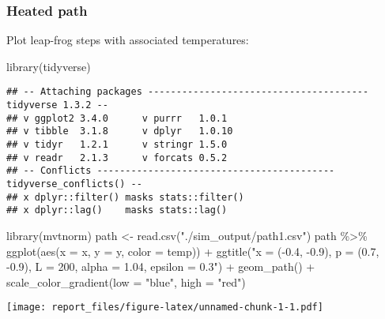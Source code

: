 \documentclass[
]{article}
\author{}
\date{\vspace{-2.5em}}
\newenvironment{Shaded}{\begin{snugshade}}{\end{snugshade}}
\newcommand{\AttributeTok}[1]{\textcolor[rgb]{0.77,0.63,0.00}{#1}}
\newcommand{\FunctionTok}[1]{\textcolor[rgb]{0.00,0.00,0.00}{#1}}
\newcommand{\NormalTok}[1]{#1}
\newcommand{\OtherTok}[1]{\textcolor[rgb]{0.56,0.35,0.01}{#1}}
\newcommand{\SpecialCharTok}[1]{\textcolor[rgb]{0.00,0.00,0.00}{#1}}
\newcommand{\StringTok}[1]{\textcolor[rgb]{0.31,0.60,0.02}{#1}}
\begin{document}
\hypertarget{heated-path}{%
\subsubsection{Heated path}\label{heated-path}}

Plot leap-frog steps with associated temperatures:

\begin{Shaded}
\begin{Highlighting}[]
\FunctionTok{library}\NormalTok{(tidyverse)}
\end{Highlighting}
\end{Shaded}

\begin{verbatim}
## -- Attaching packages --------------------------------------- tidyverse 1.3.2 --
## v ggplot2 3.4.0      v purrr   1.0.1 
## v tibble  3.1.8      v dplyr   1.0.10
## v tidyr   1.2.1      v stringr 1.5.0 
## v readr   2.1.3      v forcats 0.5.2 
## -- Conflicts ------------------------------------------ tidyverse_conflicts() --
## x dplyr::filter() masks stats::filter()
## x dplyr::lag()    masks stats::lag()
\end{verbatim}

\begin{Shaded}
\begin{Highlighting}[]
\FunctionTok{library}\NormalTok{(mvtnorm)}
\NormalTok{path }\OtherTok{\textless{}{-}} \FunctionTok{read.csv}\NormalTok{(}\StringTok{"./sim\_output/path1.csv"}\NormalTok{)}
\NormalTok{path }\SpecialCharTok{\%\textgreater{}\%}
    \FunctionTok{ggplot}\NormalTok{(}\FunctionTok{aes}\NormalTok{(}\AttributeTok{x =}\NormalTok{ x, }\AttributeTok{y =}\NormalTok{ y, }\AttributeTok{color =}\NormalTok{ temp)) }\SpecialCharTok{+}
    \FunctionTok{ggtitle}\NormalTok{(}\StringTok{"x = ({-}0.4, {-}0.9), p = (0.7, {-}0.9), L = 200, alpha = 1.04, epsilon = 0.3"}\NormalTok{) }\SpecialCharTok{+}
    \FunctionTok{geom\_path}\NormalTok{() }\SpecialCharTok{+} \FunctionTok{scale\_color\_gradient}\NormalTok{(}\AttributeTok{low =} \StringTok{"blue"}\NormalTok{, }\AttributeTok{high =} \StringTok{"red"}\NormalTok{)}
\end{Highlighting}
\end{Shaded}

\texttt{[image: report\_files/figure-latex/unnamed-chunk-1-1.pdf]}
\end{document}

